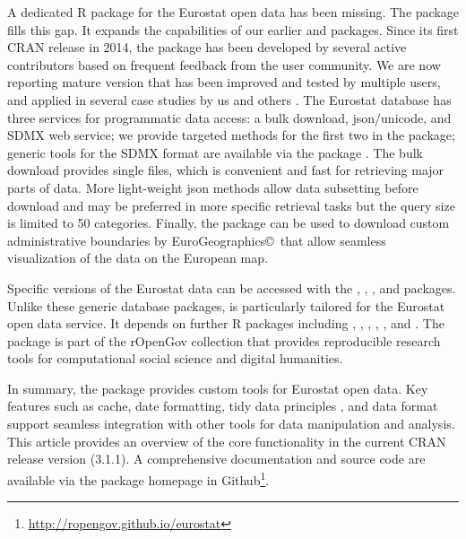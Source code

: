 A dedicated R package for the Eurostat open data has been missing. The  package fills this gap. It expands the capabilities of our earlier  \citep{statfi} and  \citep{smarterpoland} packages. Since its first CRAN release in 2014, the  package has been developed by several active contributors based on frequent feedback from the user community. We are now reporting mature version that has been improved and tested by multiple users, and applied in several case studies by us and others \citep{Kenett2016}. The Eurostat database has three services for programmatic data access: a bulk download, json/unicode, and SDMX web service; we provide targeted methods for the first two in the  package; generic tools for the SDMX format are available via the  package \citep{rsdmx}. The bulk download provides single files, which is convenient and fast for retrieving major parts of data. More light-weight json methods allow data subsetting before download and may be preferred in more specific retrieval tasks but the query size is limited to 50 categories. Finally, the package can be used to download custom administrative boundaries by EuroGeographics\copyright \ that allow seamless visualization of the data on the European map.

Specific versions of the Eurostat data can be accessed with the  \citep{datamart},  \citep{quandl},  \citep{pdfetch}, and  packages. Unlike these generic database packages,  is particularly tailored for the Eurostat open data service. It depends on further R packages including
 \citep{classInt},
 \citep{httr},
 \citep{jsonlite},
 \citep{readr},
 \citep{sp}, and
 \citep{stringi}. The  package is part of the rOpenGov collection \citep{Lahti13icml} that provides reproducible research tools for computational social science and digital humanities.

In summary, the  package provides custom tools for Eurostat open data. Key features such as cache, date formatting, tidy data principles \citep{wickham2014}, and  \citep{tibble} data format support seamless integration with other tools for data manipulation and analysis. This article provides an overview of the core functionality in the current CRAN release version (3.1.1). A comprehensive documentation and source code are available via the package homepage in Github\footnote{\url{http://ropengov.github.io/eurostat}}.


